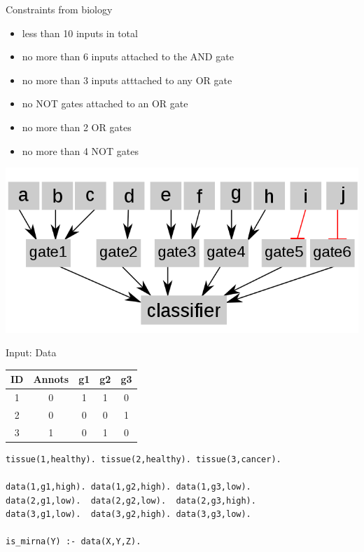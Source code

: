 \documentclass[10pt,dvipsnames]{beamer}
\begin{document}
\begin{frame}{Constraints from biology}
\begin{itemize}
 \item less than 10 inputs in total
 \item no more than 6 inputs attached to the AND gate
 \item no more than 3 inputs atttached to any OR gate
 \item no NOT gates attached to an OR gate
 \item {\color{orange} no more than 2 OR gates}
 \item no more than 4 NOT gates
\end{itemize}
\begin{center}
\includegraphics[scale=0.3]{classifier_max.png}
\end{center}
\end{frame}


\begin{frame}[fragile]{Input: Data}
\begin{center}
\begin{tabular}{|c|c|c|c|c|}
\hline
ID&	Annots&	g1&	g2&	g3\\
\hline
1&	0&	1&	1&	0\\
2&	0&	0&	0&	1\\
3&	1&	0&	1&	0\\
\hline
\end{tabular}
\end{center}
\vspace{0.2cm}
\begin{verbatim}
tissue(1,healthy). tissue(2,healthy). tissue(3,cancer).
 
data(1,g1,high). data(1,g2,high). data(1,g3,low).
data(2,g1,low).  data(2,g2,low).  data(2,g3,high).
data(3,g1,low).  data(3,g2,high). data(3,g3,low).
 
is_mirna(Y) :- data(X,Y,Z).
\end{verbatim}
\end{frame}
\end{document}
